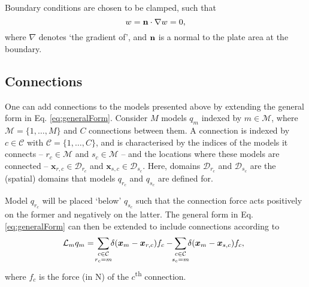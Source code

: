 \documentclass{article}
\begin{document}
Boundary conditions are chosen to be clamped, such that
\begin{equation}
        w = {\bf n} \cdot \nabla w = 0,
\end{equation}
where $\nabla$ denotes `the gradient of', and ${\bf n}$ is a normal to the plate area at the boundary.

\subsection{Connections}



One can add connections to the models presented above by extending the general form in Eq. \eqref{eq:generalForm}. Consider $M$ models $q_m$ indexed by $m \in \mathcal{M}$, where $\mathcal{M} = \{1, \hdots, M\}$ and $C$ connections between them. A connection is indexed by $c\in \mathcal{C}$ with $\mathcal{C} = \{1, \hdots, C\}$, and is characterised by the indices of the models it connects -- $r_c \in \mathcal{M}$ and $s_c\in \mathcal{M}$ -- and the locations where these models are connected -- $\boldsymbol{x}_{r, c}\in \mathcal{D}_{r_c}$ and $\boldsymbol{x}_{s, c}\in \mathcal{D}_{s_c}$. Here, domains $\mathcal{D}_{r_c}$ and $\mathcal{D}_{s_c}$ are the (spatial) domains that models $q_{r_c}$ and $q_{s_c}$ are defined for.  

Model $q_{r_c}$ will be placed `below' $q_{s_c}$ such that the connection force acts positively on the former and negatively on the latter. The general form in Eq. \eqref{eq:generalForm} can then be extended to include connections according to
\begin{equation}\label{eq:generalFormConnections}
    \!\!\!\mathcal{L}_mq_m =\!\sum_{\substack{c\in \mathcal{C}\vspace{0.1em}\\ r_c = m}}\!\! \delta(\boldsymbol{x}_m - \boldsymbol{x}_{r, c}) f_c-\!\! \sum_{\substack{c\in \mathcal{C}\vspace{0.1em}\\ s_c = m}}\!\! \delta(\boldsymbol{x}_m - \boldsymbol{x}_{s,c}) f_c,
\end{equation}
where $f_c$ is the force (in N) of the $c$\textsuperscript{th} connection.
\end{document}
